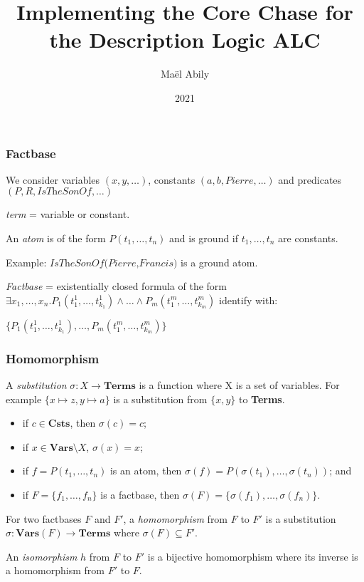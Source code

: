 \documentclass{beamer}
\title{Implementing the Core Chase for the Description Logic ALC}
\author{Maël Abily}
\institute{INRIA}
\date{2021}
\newcommand{\Vars}{\textbf{Vars}}
\newcommand{\Terms}{\textbf{Terms}}
\newcommand{\Csts}{\textbf{Csts}}
\begin{document}
\frame{\titlepage}

\begin{frame}
\frametitle{Factbase}
We consider variables $(x,y,\ldots)$, constants $(a,b,\textit{Pierre},\ldots)$ and predicates $(P,R,\textit{IsTheSonOf},\ldots)$

\emph{term} = variable or constant.

An \emph{atom} is of the form $P(t_1,\ldots,t_n)$ and is ground if $t_1,\ldots,t_n$ are constants.

Example: $\textit{IsTheSonOf(Pierre,Francis)}$ is a ground atom.

\emph{Factbase} = existentially closed formula of the form $\exists x_{1},\ldots,x_{n}.P_{1}(t_{1}^{1},\ldots,t_{k_{1}}^{1})\land \ldots\land P_{m}(t_{1}^{m},\ldots,t_{k_{m}}^{m})$ identify with:

$\{P_{1}(t_{1}^{1},\ldots,t_{k_{1}}^{1}), \ldots, P_{m}(t_{1}^{m},\ldots,t_{k_{m}}^{m})\}$ 
\end{frame}

\begin{frame}
\frametitle{Homomorphism}

A \emph{substitution} $\sigma:X \to \Terms$ is a function where X is a set of variables. For example $\{x \mapsto z, y \mapsto a \}$ is a substitution from $\{x,y\}$ to \Terms.
\begin{itemize}
\item if $c \in \Csts$, then $\sigma(c) = c$;
\item if $x \in \Vars \setminus X$, $\sigma(x) = x$;
\item if $f = P(t_1,\ldots,t_n)$ is an atom, then $\sigma(f) = P(\sigma(t_1),\ldots,\sigma(t_n))$; and
\item if $F = \{f_1,\ldots,f_n\}$ is a factbase, then $\sigma(F) = \{\sigma(f_1),\ldots,\sigma(f_n)\}$.
\end{itemize}

For two factbases $F$ and $F'$, a \emph{homomorphism} from $F$ to $F'$ is a substitution $\sigma:\Vars(F) \to \Terms$ where $\sigma(F) \subseteq F'$. 

An \emph{isomorphism} $h$ from $F$ to $F'$ is a bijective homomorphism where its inverse is a homomorphism from $F'$ to $F$. 


\end{frame}
\end{document}
